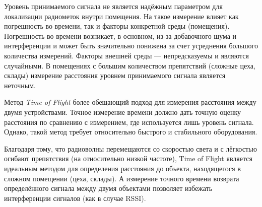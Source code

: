Уровень принимаемого сигнала не является надёжным параметром для локализации радиометок внутри помещения. На такое измерение влияет как погрешность во времени, так и факторы конкретной среды (помещения). Погрешность во времени возникает, в основном, из-за добавочного шума и интерференции и может быть значительно понижена за счет усреднения большого количества измерений. Факторы внешней среды --- непредсказуемы и являются случайными. В помещениях с большим количеством препятствий (сложные цеха, склады) измерение расстояния уровнем принимаемого сигнала является неточным.

Метод \textit{Time of Flight} более обещающий подход для измерения расстояния между двумя устройствами. Точное измерение времени должно дать точную оценку расстояния по сравнению с измерением, где используется лишь уровень сигнала. Однако, такой метод требует относительно быстрого и стабильного оборудования.

Благодаря тому, что радиоволны перемещаются со скоростью света и с лёгкостью огибают препятствия (на относительно низкой частоте), Time of Flight является идеальным методом для определения расстояния до объекта, находящегося в сложном помещении (цеха, склады). А измерение точного времени возврата определённого сигнала между двумя объектами позволяет избежать интерференции сигналов (как в случае RSSI).
